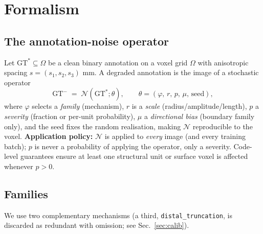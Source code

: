\documentclass[
    bookmarks, bookmarksnumbered, bookmarksopen,
    colorlinks=true, citecolor=blue, linkcolor=blue, urlcolor=blue
]{techrep}
\newcommand{\gtstar}{\ensuremath{\mathrm{GT}^{\!*}}}
\newcommand{\gtminus}{\ensuremath{\mathrm{GT}^{\!-}}}
\newcommand{\Nop}{\ensuremath{\mathcal{N}}}
\begin{document}
\chapter{Formalism}\label{sec:formalism}
\section{The annotation-noise operator}
Let $\gtstar\subseteq\Omega$ be a clean binary annotation on a voxel grid $\Omega$
with anisotropic spacing $s=(s_1,s_2,s_3)$ mm. A degraded annotation is the image of a
stochastic operator
\begin{equation}
  \gtminus \;=\; \Nop(\gtstar;\theta),
  \qquad
  \theta=(\varphi,\,r,\,p,\,\mu,\,\text{seed}),
\end{equation}
where $\varphi$ selects a \emph{family} (mechanism), $r$ is a \emph{scale}
(radius/amplitude/length), $p$ a \emph{severity} (fraction or per-unit probability),
$\mu$ a \emph{directional bias} (boundary family only), and the seed fixes the random
realisation, making $\Nop$ reproducible to the voxel. \textbf{Application policy:}
$\Nop$ is applied to \emph{every} image (and every training batch); $p$ is never a
probability of applying the operator, only a severity. Code-level guarantees ensure at
least one structural unit or surface voxel is affected whenever $p>0$.

\section{Families}
We use two complementary mechanisms (a third, \texttt{distal\_truncation}, is
discarded as redundant with omission; see Sec.~\ref{sec:calib}).
\end{document}
